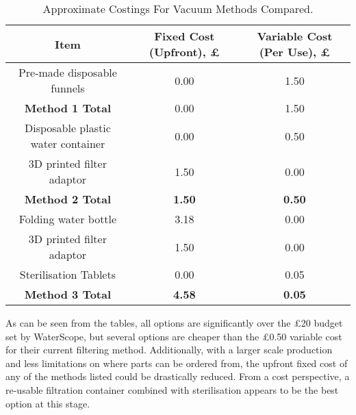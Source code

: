 \documentclass[12pt]{article}
\begin{document}
\begin{table}[]
\centering
\begin{tabular}{|ccc|}
\hline
\multicolumn{1}{|c|}{\textbf{Item}}           & \multicolumn{1}{c|}{\textbf{Fixed Cost (Upfront), \pounds}} & \textbf{Variable Cost (Per Use), \pounds} \\ \hline
Pre-made disposable funnels                   & 0.00                                                  & 1.50                                \\ \hline
\multicolumn{1}{|c|}{\textbf{Method 1 Total}} & \multicolumn{1}{c|}{0.00}                             & 1.50                                \\ \hline
Disposable plastic water container            & 0.00                                                  & 0.50                                \\
3D printed filter adaptor                     & 1.50                                                  & 0.00                                \\ \hline
\multicolumn{1}{|c|}{\textbf{Method 2 Total}} & \multicolumn{1}{c|}{\textbf{1.50}}                    & \textbf{0.50}                       \\ \hline
Folding water bottle                          & 3.18                                                  & 0.00                                \\
3D printed filter adaptor                     & 1.50                                                  & 0.00                                \\
Sterilisation Tablets                         & 0.00                                                  & 0.05                                \\ \hline
\multicolumn{1}{|c|}{\textbf{Method 3 Total}} & \multicolumn{1}{c|}{\textbf{4.58}}                    & \textbf{0.05}                       \\ \hline
\end{tabular}
\caption{\label{tab:vacuumcost2}Approximate Costings For Vacuum Methods Compared.}
\end{table}

As can be seen from the tables, all options are significantly over the \pounds20 budget set by WaterScope, but several options are cheaper than the \pounds0.50 variable cost for their current filtering method. Additionally, with a larger scale production and less limitations on where parts can be ordered from, the upfront fixed cost of any of the methods listed could be drastically reduced. From a cost perspective, a re-usable filtration container combined with sterilisation appears to be the best option at this stage.
\end{document}
